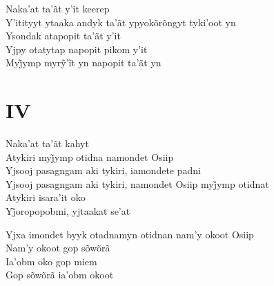 \begin{linenumbers}\begingroup\raggedright
 
\noindent   Naka'at ta'ãt y'it keerep\\
  Y'itityyt ytaaka andyk ta'ãt ypyokõrõngyt tyki'oot yn\\
  Ysondak atapopit ta'ãt y'it\\
  Yjpy otatytap napopit pikom y'it\\
  Myj̃ymp myrỹ’ĩt yn napopit ta’ãt yn
 
 
\medskip
\section{IV}

  \noindent Naka'at ta'ãt kahyt\\
  Atykiri myj̃ymp otidna namondet Osiip\\
  Yjsooj pasagngam aki tykiri, iamondete padni\\
  Yjsooj pasagngam aki tykiri, namondet Osiip myj̃ymp otidnat\\
  Atykiri isara'it oko\\
  Yj̃oropopobmi, yjtaakat se’at
 
\end{linenumbers}\endgroup

\bigskip

\begin{linenumbers}\begingroup\raggedright
 
\noindent   Yjxa imondet byyk otadnamyn otidnan nam'y okoot Osiip\\
  Nam'y okoot gop sõwõrã\\
  Ia'obm oko gop miem\\
  Gop sõwõrã ia'obm okoot
 
\end{linenumbers}\endgroup

